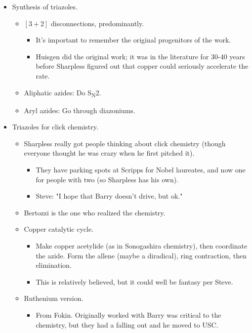 \documentclass[../notes.tex]{subfiles}
\begin{document}
\begin{itemize}
\begin{itemize}
\begin{itemize}
        \end{itemize}
    \end{itemize}
    \item Synthesis of triazoles.
    \begin{itemize}
        \item $[3+2]$ disconnections, predominantly.
        \begin{itemize}
            \item It's important to remember the original progenitors of the work.
            \item Huisgen did the original work; it was in the literature for 30-40 years before Sharpless figured out that copper could seriously accelerate the rate.
        \end{itemize}
        \item Aliphatic azides: Do S\textsubscript{N}2.
        \item Aryl azides: Go through diazoniums.
    \end{itemize}
    \item Triazoles for click chemistry.
    \begin{itemize}
        \item Sharpless really got people thinking about click chemistry (though everyone thought he was crazy when he first pitched it).
        \begin{itemize}
            \item They have parking spots at Scripps for Nobel laureates, and now one for people with two (so Sharpless has his own).
            \item Steve: "I hope that Barry doesn't drive, but ok."
        \end{itemize}
        \item Bertozzi is the one who realized the chemistry.
        \item Copper catalytic cycle.
        \begin{itemize}
            \item Make copper acetylide (as in Sonogashira chemistry), then coordinate the azide. Form the allene (maybe a diradical), ring contraction, then elimination.
            \item This is relatively believed, but it could well be fantasy per Steve.
        \end{itemize}
        \item Ruthenium version.
        \begin{itemize}
            \item From Fokin. Originally worked with Barry was critical to the chemistry, but they had a falling out and he moved to USC.

\end{itemize}
\end{itemize}
\end{itemize}
\end{document}
